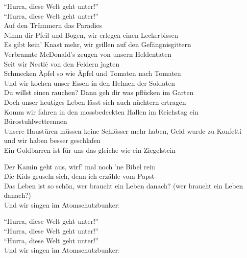 \documentclass[]{book}
\begin{document}
``Hurra, diese Welt geht unter!''\\
``Hurra, diese Welt geht unter!''\\
Auf den Trümmern das Paradies\\
Nimm dir Pfeil und Bogen, wir erlegen einen Leckerbissen\\
Es gibt kein' Knast mehr, wir grillen auf den Gefängnisgittern\\
Verbrannte McDonald's zeugen von unsern Heldentaten\\
Seit wir Nestlé von den Feldern jagten\\
Schmecken Äpfel so wie Äpfel und Tomaten nach Tomaten\\
Und wir kochen unser Essen in den Helmen der Soldaten\\
Du willst einen rauchen? Dann geh dir was pflücken im Garten\\
Doch unser heutiges Leben lässt sich auch nüchtern ertragen\\
Komm wir fahren in den mossbedeckten Hallen im Reichstag ein Bürostuhlwettrennen\\
Unsere Haustüren müssen keine Schlösser mehr haben, Geld wurde zu Konfetti und wir haben besser geschlafen\\
Ein Goldbarren ist für uns das gleiche wie ein Ziegelstein

Der Kamin geht aus, wirf' mal noch 'ne Bibel rein\\
Die Kids gruseln sich, denn ich erzähle vom Papst\\
Das Leben ist so schön, wer braucht ein Leben danach? (wer braucht ein Leben danach?)\\
Und wir singen im Atomschutzbunker:

``Hurra, diese Welt geht unter!''\\
``Hurra, diese Welt geht unter!''\\
``Hurra, diese Welt geht unter!''\\
Und wir singen im Atomschutzbunker:
\end{document}
